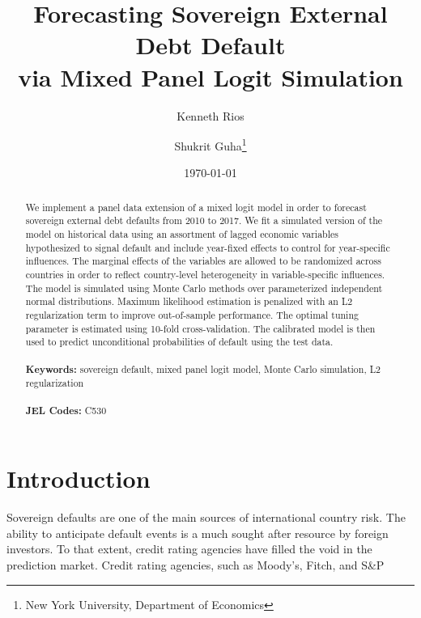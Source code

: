 \documentclass[12pt]{article}
\begin{document}
\begin{titlepage}
\title{Forecasting Sovereign External Debt Default \\ via Mixed Panel Logit Simulation}
\author{Kenneth Rios\footnotemark[1] \and Shukrit Guha\thanks{New York University, Department of Economics}}
\date{\today}
\maketitle
\begin{abstract}
\noindent We implement a panel data extension of a mixed logit model in order to forecast sovereign external debt defaults from 2010 to 2017. We fit a simulated version of the model on historical data using an assortment of lagged economic variables hypothesized to signal default and include year-fixed effects to control for year-specific influences. The marginal effects of the variables are allowed to be randomized across countries in order to reflect country-level heterogeneity in variable-specific influences. The model is simulated using Monte Carlo methods over parameterized independent normal distributions. Maximum likelihood estimation is penalized with an L2 regularization term to improve out-of-sample performance. The optimal tuning parameter is estimated using 10-fold cross-validation. The calibrated model is then used to predict unconditional probabilities of default using the test data. \\
\vspace{0in}\\
\noindent\textbf{Keywords:} sovereign default, mixed panel logit model, Monte Carlo simulation, L2 regularization \\
\vspace{0in}\\
\noindent\textbf{JEL Codes:} C530\\

\bigskip
\end{abstract}
\setcounter{page}{0}
\thispagestyle{empty}
\end{titlepage}
\pagebreak \newpage




\singlespacing


\section{Introduction} \label{sec:introduction}

Sovereign defaults are one of the main sources of international country risk. The ability to anticipate default events is a much sought after resource by foreign investors. To that extent, credit rating agencies have filled the void in the prediction market. Credit rating agencies, such as Moody's, Fitch, and S\&P
\end{document}
